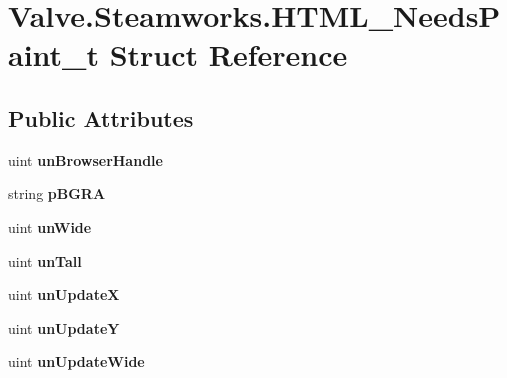 \hypertarget{structValve_1_1Steamworks_1_1HTML__NeedsPaint__t}{}\section{Valve.\+Steamworks.\+H\+T\+M\+L\+\_\+\+Needs\+Paint\+\_\+t Struct Reference}
\label{structValve_1_1Steamworks_1_1HTML__NeedsPaint__t}
\subsection*{Public Attributes}
\begin{DoxyCompactItemize}
\item 
\hypertarget{structValve_1_1Steamworks_1_1HTML__NeedsPaint__t_a0e0e9c4fe75533eb8dcb942e1725252f}{}uint {\bfseries un\+Browser\+Handle}\label{structValve_1_1Steamworks_1_1HTML__NeedsPaint__t_a0e0e9c4fe75533eb8dcb942e1725252f}

\item 
\hypertarget{structValve_1_1Steamworks_1_1HTML__NeedsPaint__t_ab007d004f4714d6045b8ebf609bbfb41}{}string {\bfseries p\+B\+G\+R\+A}\label{structValve_1_1Steamworks_1_1HTML__NeedsPaint__t_ab007d004f4714d6045b8ebf609bbfb41}

\item 
\hypertarget{structValve_1_1Steamworks_1_1HTML__NeedsPaint__t_a4129fee4d4e65fa61e01ed850c86bce6}{}uint {\bfseries un\+Wide}\label{structValve_1_1Steamworks_1_1HTML__NeedsPaint__t_a4129fee4d4e65fa61e01ed850c86bce6}

\item 
\hypertarget{structValve_1_1Steamworks_1_1HTML__NeedsPaint__t_a0f8237b50327d57240a87aa75ab22f42}{}uint {\bfseries un\+Tall}\label{structValve_1_1Steamworks_1_1HTML__NeedsPaint__t_a0f8237b50327d57240a87aa75ab22f42}

\item 
\hypertarget{structValve_1_1Steamworks_1_1HTML__NeedsPaint__t_acc6f0d583033b2160de06e6b3cdaa945}{}uint {\bfseries un\+Update\+X}\label{structValve_1_1Steamworks_1_1HTML__NeedsPaint__t_acc6f0d583033b2160de06e6b3cdaa945}

\item 
\hypertarget{structValve_1_1Steamworks_1_1HTML__NeedsPaint__t_ac23fcf135e83cd8e3f9d109cc0d652f9}{}uint {\bfseries un\+Update\+Y}\label{structValve_1_1Steamworks_1_1HTML__NeedsPaint__t_ac23fcf135e83cd8e3f9d109cc0d652f9}

\item 
\hypertarget{structValve_1_1Steamworks_1_1HTML__NeedsPaint__t_a74a3bbae302d8249ae737085bca3a147}{}uint {\bfseries un\+Update\+Wide}\label{structValve_1_1Steamworks_1_1HTML__NeedsPaint__t_a74a3bbae302d8249ae737085bca3a147}


\end{DoxyCompactItemize}
